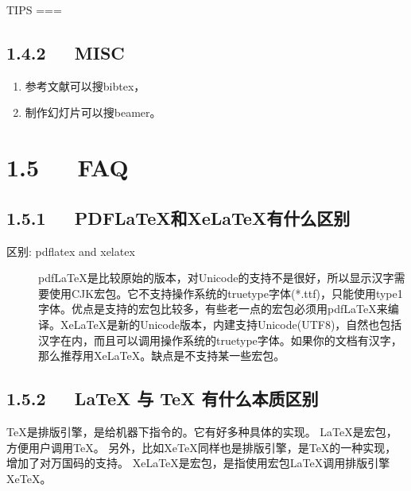 \documentclass[letterpaper,12pt,english]{sphinxmanual}
\begin{document}
TIPS
===


\subsection{1.4.2   MISC}
\label{\detokenize{001software/001install/LaTex:misc}}\begin{enumerate}
%
\item {} 
参考文献可以搜bibtex，

\item {} 
制作幻灯片可以搜beamer。

\end{enumerate}


\section{1.5   FAQ}
\label{\detokenize{001software/001install/LaTex:faq}}

\subsection{1.5.1   PDFLaTeX和XeLaTeX有什么区别}
\label{\detokenize{001software/001install/LaTex:pdflatexxelatex}}\begin{description}
\item[{区别: pdflatex and xelatex}] \leavevmode
pdfLaTeX是比较原始的版本，对Unicode的支持不是很好，所以显示汉字需要使用CJK宏包。它不支持操作系统的truetype字体(*.ttf)，只能使用type1字体。优点是支持的宏包比较多，有些老一点的宏包必须用pdfLaTeX来编译。XeLaTeX是新的Unicode版本，内建支持Unicode(UTF\sphinxhyphen{}8)，自然也包括汉字在内，而且可以调用操作系统的truetype字体。如果你的文档有汉字，那么推荐用XeLaTeX。缺点是不支持某一些宏包。

\end{description}


\subsection{1.5.2   LaTeX 与 TeX 有什么本质区别}
\label{\detokenize{001software/001install/LaTex:latex-tex}}
TeX是排版引擎，是给机器下指令的。它有好多种具体的实现。
LaTeX是宏包，方便用户调用TeX。
另外，比如XeTeX同样也是排版引擎，是TeX的一种实现，增加了对万国码的支持。
XeLaTeX是宏包，是指使用宏包LaTeX调用排版引擎XeTeX。
\end{document}
